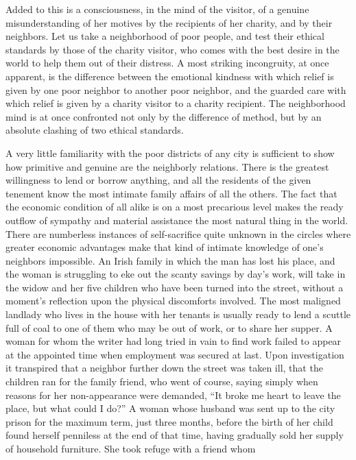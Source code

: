 \documentclass[]{article}
\begin{document}
\begin{sectionbody}
\addamsparagraph Added to this is a consciousness, in the mind of the visitor, of a
genuine misunderstanding of her motives by the recipients of her
charity, and by their neighbors. Let us take a neighborhood of poor
people, and test their ethical standards by those of the charity
visitor, who comes with the best desire in the world to help them out of
their distress. A most striking incongruity, at once apparent, is the
difference between the emotional kindness with which relief is given by
one poor neighbor to another poor neighbor, and the guarded care with
which relief is given by a charity visitor to a charity recipient. The
neighborhood mind is at once confronted not only by the difference of
method, but by an absolute clashing of two ethical standards.

\addamsparagraph A very little familiarity with the poor districts of any city is
sufficient to show how primitive and genuine are the neighborly
relations. There is the greatest willingness to lend or borrow anything,
and all the residents of the given tenement know the most intimate
family affairs of all the others. The fact that the economic condition
of all alike is on a most precarious level makes the ready outflow of
sympathy and material assistance the most natural thing in the world.
There are numberless instances of self-sacrifice quite unknown in the
circles where greater economic advantages make that kind of intimate
knowledge of one's neighbors impossible. An Irish family in which the
man has lost his place, and the woman is struggling to eke out the
scanty savings by day's work, will take in the widow and her five
children who have been turned into the street, without a moment's
reflection upon the physical discomforts involved. The most maligned
landlady who lives in the house with her tenants is usually ready to
lend a scuttle full of coal to one of them who may be out of work, or to
share her supper. A woman for whom the writer had long tried in vain to
find work failed to appear at the appointed time when employment was
secured at last. Upon investigation it transpired that a neighbor
further down the street was taken ill, that the children ran for the
family friend, who went of course, saying simply when reasons for her
non-appearance were demanded, ``It broke me heart to leave the place, but
what could I do?'' A woman whose husband was sent up to the city prison
for the maximum term, just three months, before the birth of her child
found herself penniless at the end of that time, having gradually sold
her supply of household furniture. She took refuge with a friend whom

\end{sectionbody}
\end{document}
